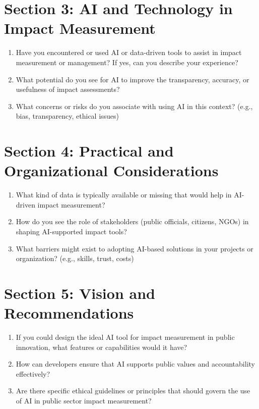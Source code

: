 \vspace{1em}

\section*{Section 3: AI and Technology in Impact Measurement}

\begin{enumerate}
    \item Have you encountered or used AI or data-driven tools to assist in impact measurement or management? If yes, can you describe your experience?
    \item What potential do you see for AI to improve the transparency, accuracy, or usefulness of impact assessments?
    \item What concerns or risks do you associate with using AI in this context? (e.g., bias, transparency, ethical issues)
\end{enumerate}

\vspace{1em}

\section*{Section 4: Practical and Organizational Considerations}

\begin{enumerate}
    \item What kind of data is typically available or missing that would help in AI-driven impact measurement?
    \item How do you see the role of stakeholders (public officials, citizens, NGOs) in shaping AI-supported impact tools?
    \item What barriers might exist to adopting AI-based solutions in your projects or organization? (e.g., skills, trust, costs)
\end{enumerate}

\vspace{1em}

\section*{Section 5: Vision and Recommendations}

\begin{enumerate}
    \item If you could design the ideal AI tool for impact measurement in public innovation, what features or capabilities would it have?
    \item How can developers ensure that AI supports public values and accountability effectively?
    \item Are there specific ethical guidelines or principles that should govern the use of AI in public sector impact measurement?
\end{enumerate}

